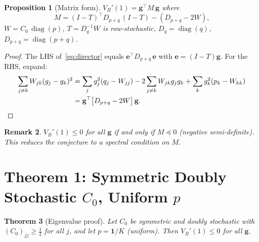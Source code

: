 \documentclass[11pt]{article}
\newtheorem{theorem}{Theorem}
\newtheorem{proposition}[theorem]{Proposition}
\newtheorem{remark}[theorem]{Remark}
\DeclareMathOperator{\diag}{diag}
\begin{document}
\begin{proposition}[Matrix form]
\label{prop:matrix}
$V_B'(1) = \mathbf{g}^\top M\,\mathbf{g}$ where
\[
  M = (I - T)^\top D_{p+q}\,(I - T) - (D_{p+q} - 2W),
\]
$W = C_0\,\diag(p)$, $T = D_q^{-1} W$ is row-stochastic, $D_q = \diag(q)$, $D_{p+q} = \diag(p+q)$.
\end{proposition}

\begin{proof}
The LHS of~\eqref{eq:director} equals $\mathbf{e}^\top D_{p+q}\,\mathbf{e}$ with $\mathbf{e} = (I-T)\mathbf{g}$.
For the RHS, expand:
\begin{align*}
  \sum_{j\neq k} W_{jk}(g_j-g_k)^2
  &= \sum_j g_j^2(q_j - W_{jj}) - 2\sum_{j\neq k} W_{jk}g_jg_k + \sum_k g_k^2(p_k - W_{kk}) \\
  &= \mathbf{g}^\top\bigl[D_{p+q} - 2W\bigr]\,\mathbf{g}. \qedhere
\end{align*}
\end{proof}

\begin{remark}
$V_B'(1) \leq 0$ for all $\mathbf{g}$ if and only if $M \preceq 0$ (negative semi-definite).
This reduces the conjecture to a spectral condition on $M$.
\end{remark}

\section{Theorem 1: Symmetric Doubly Stochastic $C_0$, Uniform $p$}

\begin{theorem}[Eigenvalue proof]
\label{thm:ds_symmetric}
Let $C_0$ be symmetric and doubly stochastic with $(C_0)_{jj} \geq \tfrac{1}{2}$ for all $j$,
and let $p = \mathbf{1}/K$ (uniform). Then $V_B'(1) \leq 0$ for all $\mathbf{g}$.
\end{theorem}
\end{document}

